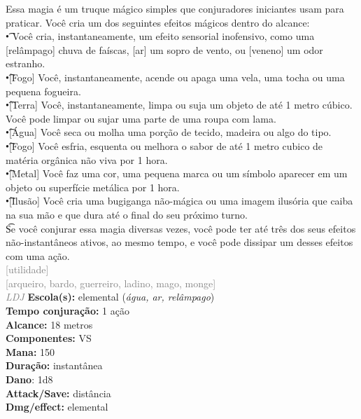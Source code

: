\documentclass{RPG_Adventure}[2021/10/20]
\begin{document}
{\normalsize Essa magia é um truque mágico simples que conjuradores iniciantes usam para praticar. Você cria um dos seguintes efeitos mágicos dentro do alcance:\\\t • Você cria, instantaneamente, um efeito sensorial inofensivo, como uma [relâmpago] chuva de faíscas, [ar] um sopro de vento, ou [veneno] um odor estranho.\\\t •[Fogo] Você, instantaneamente, acende ou apaga uma vela, uma tocha ou uma pequena fogueira.\\\t •[Terra] Você, instantaneamente, limpa ou suja um objeto de até 1 metro cúbico. Você pode limpar ou sujar uma parte de uma roupa com lama.\\\t •[Água] Você seca ou molha uma porção de tecido, madeira ou algo do tipo.\\\t •[Fogo] Você esfria, esquenta ou melhora o sabor de até 1 metro cubico de matéria orgânica não viva por 1 hora.\\\t •[Metal] Você faz uma cor, uma pequena marca ou um símbolo aparecer em um objeto ou superfície metálica por 1 hora.\\\t •[Ilusão] Você cria uma bugiganga não-mágica ou uma imagem ilusória que caiba na sua mão e que dura até o final do seu próximo turno.\\\t Se você conjurar essa magia diversas vezes, você pode ter até três dos seus efeitos não-instantâneos ativos, ao mesmo tempo, e você pode dissipar um desses efeitos com uma ação.\\}
{\scriptsize \textcolor{gray}{[utilidade]\\}}
{\scriptsize \textcolor{gray}{[arqueiro, bardo, guerreiro, ladino, mago, monge]\\}}
{\tiny \textcolor{gray}{\textit{LDJ}}}\jump{}
{\small \t \textbf{Escola(s):} elemental (\textit{água, ar, relâmpago})\\\t \textbf{Tempo conjuração:} 1 ação\\\t \textbf{Alcance:} 18 metros\\\t \textbf{Componentes:} VS\\\t \textbf{Mana:} 150\\\t \textbf{Duração:} instantânea\\\t \textbf{Dano}: 1d8\\\t \textbf{Attack/Save:} distância\\\t \textbf{Dmg/effect:} elemental\\}
\end{document}
